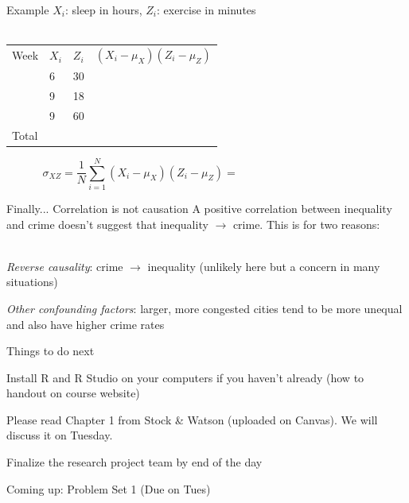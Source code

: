 \documentclass{./../div_teaching_slides}
\begin{document}
\begin{frame}{Example}
\vspace{-0.25em}
$X_i$: sleep in hours, $Z_i$: exercise in minutes \\~\\
\begin{tabularx}{1\textwidth}{P{1.5cm}P{1.5cm}P{1.5cm}Y}
\hline \addlinespace[0.5em]
Week & $X_i$ & $Z_i$ & $(X_i-\mu_X)(Z_i-\mu_Z)$   \\ \addlinespace[0.5em] \hline {} & 6 & 30 &    \\ \hline {} & 9 & 18 &    \\ \hline {} & 9 & 60 &    \\ \hline \addlinespace[0.5em]
 Total & & & \\
 \hline 
\end{tabularx} 
$$ \sigma_{XZ} = \frac{1}{N}\sum_{i=1}^N (X_i-\mu_X)(Z_i-\mu_Z) = \hspace{5cm} $$
\end{frame}


\begin{frame}{Finally... Correlation is not causation}
A positive correlation between inequality and crime doesn't suggest that inequality $\rightarrow$ crime. This is for two reasons: \\~\\
\begin{witemize}
  \item \textit{Reverse causality}: crime $\rightarrow$ inequality (unlikely here but a concern in many situations)
  \item \textit{Other confounding factors}: larger, more congested cities tend to be more unequal and also have higher crime rates
\end{witemize}
\end{frame}


\begin{frame}{Things to do next}
\begin{witemize}
\item Install R and R Studio on your computers if you haven't already (how to handout on course website)
\item Please read Chapter 1 from Stock \& Watson (uploaded on Canvas). We will discuss it on Tuesday. 
\item Finalize the research project team by end of the day
\item Coming up: Problem Set 1 (Due on Tues)
\end{witemize}
\end{frame}
\end{document}
